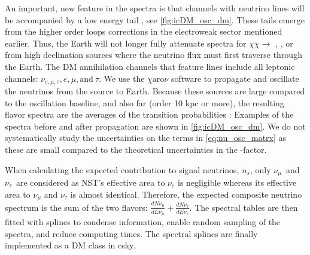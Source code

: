 An important, new feature in the spectra is that channels with neutrino lines will be accompanied by a low energy tail \cite{Rodd:HDM_spec}, see \cref{fig:icDM_osc_dm}.
These tails emerge from the higher order loops corrections in the electroweak sector mentioned earlier.
Thus, the Earth will not longer fully attenuate spectra for $\chi\chi \rightarrow$ , \parpar{\nu_\mu}, or \parpar{\nu_\tau} from high declination sources where the neutrino flux must first traverse through the Earth.
The DM annihilation channels that feature lines include all leptonic channels: $\nu_{e,\mu,\tau}, e, \mu, \mathrm{and}~\tau$.
We use the \href{https://iopscience.iop.org/article/10.1088/1475-7516/2020/10/043}{ $\chi \mathrm{aro}\nu$} software to propagate and oscillate the neutrinos from the source to Earth.
Because these sources are large compared to the oscillation baseline, and also far (order 10 kpc or more), the resulting flavor spectra are the averages of the transition probabilities \cite{Charon}:
\nuOscMatrix
Examples of the spectra before and after propagation are shown in \cref{fig:icDM_osc_dm}.
We do not systematically study the uncertainties on the terms in \cref{eq:nu_osc_matrx} as these are small compared to the theoretical uncertainties in the \J-factor.

When calculating the expected contribution to signal neutrinos, $n_s$, only $ \nu_\mu$~and $\nu_\tau$~are considered as NST's effective area to $ \nu_e $ is negligible \cite{IC3_thesis_Cerver} whereas its effective area to $\nu_\mu$ and $\nu_\tau$ is almost identical.
Therefore, the expected composite neutrino spectrum is the sum of the two flavors: $\frac{dN\nu_\mu}{dE\nu_\mu} + \frac{dN\nu_\tau}{dE\nu_\tau}$.
The spectral tables are then fitted with splines to condense information, enable random sampling of the spectra, and reduce computing times.
The spectral splines are finally implemented as a DM class in csky.



